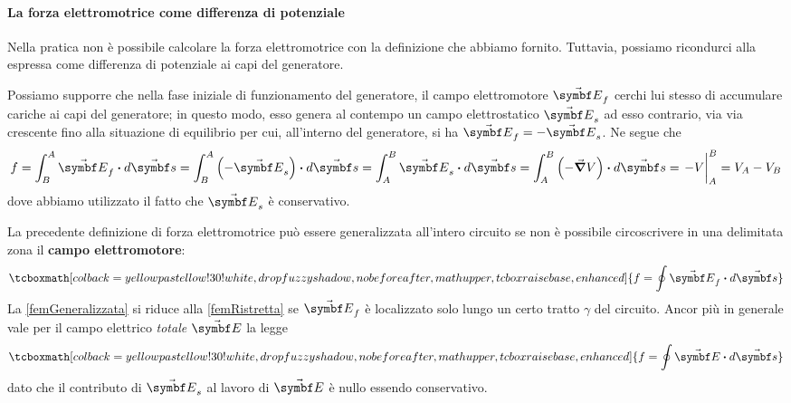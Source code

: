 \paragraph{La forza elettromotrice come differenza di potenziale}
Nella pratica non è possibile calcolare la forza elettromotrice con la definizione che abbiamo fornito. Tuttavia, possiamo ricondurci alla \fem espressa come differenza di potenziale ai capi del generatore.

Possiamo supporre che nella fase iniziale di funzionamento del generatore, il campo elettromotore $\vba{E}_f$ cerchi lui stesso di accumulare cariche ai capi del generatore; in questo modo, esso genera al contempo un campo elettrostatico $\vba{E}_s$ ad esso contrario, via via crescente fino alla situazione di equilibrio per cui, all'interno del generatore, si ha $\vba{E}_f=-\vba{E}_s$. Ne segue che
\begin{equation*}
	f=\int_{B}^{A}\vba{E}_f\vdot d\vba{s}=\int_{B}^{A}\left(-\vba{E}_s\right)\vdot d\vba{s}=\int_A^B\vba{E}_s\vdot d\vba{s}=\int_A^B\left(-\grad{V}\right)\vdot d\vba{s}=\eval{-V}_A^B=V_A-V_B
\end{equation*}
dove abbiamo utilizzato il fatto che $\vba{E}_s$ è conservativo.

La precedente definizione di forza elettromotrice può essere generalizzata all'intero circuito se non è possibile circoscrivere in una delimitata zona il \textbf{campo elettromotore}:
\begin{equation}
	\tcboxmath[colback=yellowpastellow!30!white,drop fuzzy shadow, nobeforeafter, math upper, tcbox raise base, enhanced]{f=\oint \vba{E}_f\vdot d\vba{s}}\label{femGeneralizzata}
\end{equation}
La \eqref{femGeneralizzata} si riduce alla \eqref{femRistretta} se $\vba{E}_f$ è localizzato solo lungo un certo tratto $\gamma$ del circuito. Ancor più in generale vale per il campo elettrico \textit{totale} $\vba{E}$ la legge
\begin{equation}
	\tcboxmath[colback=yellowpastellow!30!white,drop fuzzy shadow, nobeforeafter, math upper, tcbox raise base, enhanced]{f=\oint \vba{E}\vdot d\vba{s}}
\end{equation}
dato che il contributo di $\vba{E}_s$ al lavoro di $\vba{E}$ è nullo essendo conservativo.
